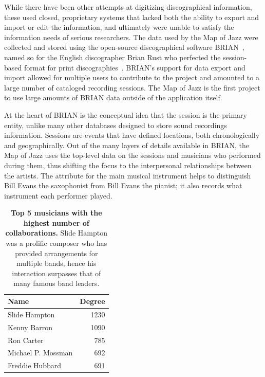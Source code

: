 \documentclass[12pt]{cmuthesis}
\begin{document}
  While there have been other attempts at digitizing discographical information, these used closed, proprietary systems that lacked both the ability to export and import or edit the information, and ultimately were unable to satisfy the information needs of serious researchers. The data used by the Map of Jazz were collected and stored using the open-source discographical software BRIAN~\cite{Albin}, named so for the English discographer Brian Rust who perfected the session-based format for print discographies~\cite{Rust1980,Rust2002}. BRIAN's support for data export and import allowed for multiple users to contribute to the project and amounted to a large number of cataloged recording sessions. The Map of Jazz is the first project to use large amounts of BRIAN data outside of the application itself.

  At the heart of BRIAN is the conceptual idea that the session is the primary entity, unlike many other databases designed to store sound recordings information. Sessions are events that have defined locations, both chronologically and geographically. Out of the many layers of details available in BRIAN, the Map of Jazz uses the top-level data on the sessions and musicians who performed during them, thus shifting the focus to the interpersonal relationships between the artists. The attribute for the main musical instrument helps to distinguish Bill Evans the saxophonist from Bill Evans the pianist; it also records what instrument each performer played.
  \begin{table}
    \centering
    \begin{tabular}{l  r}
    \toprule
    Name & Degree \\
    \midrule
    Slide Hampton & 1230\\
    Kenny Barron & 1090\\
    Ron Carter & 785\\
    Michael P. Mossman & 692\\
    Freddie Hubbard & 691\\
    \bottomrule
    \end{tabular}
    \caption{\textbf{Top 5 musicians with the highest number of collaborations.} Slide
    Hampton was a prolific composer who has provided arrangements for multiple
    bands, hence his interaction surpasses that of many famous band leaders.}
    \label{tab:high_degree}
  \end{table}

\end{document}
